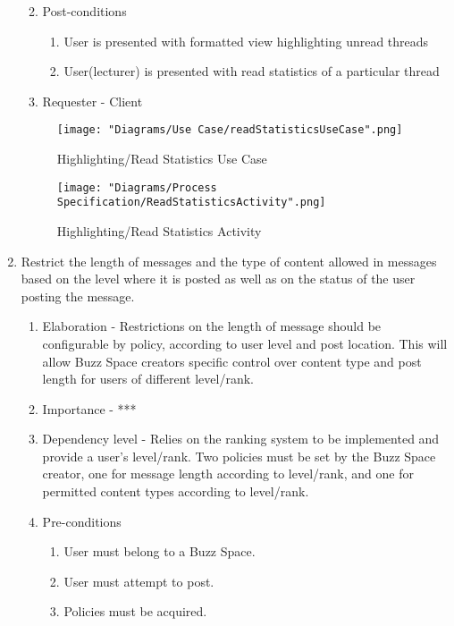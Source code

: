 \documentclass[12pt]{article}
\begin{document}
\begin{enumerate}
\begin{enumerate}
\begin{enumerate}
    \end{enumerate}
        \item Post-conditions
    \begin{enumerate}
    	\item User is presented with formatted view highlighting unread threads
    	\item User(lecturer) is presented with read statistics of a particular thread
    \end{enumerate}
    \item Requester - Client
  \end{enumerate}
  \begin{figure}[h]
  		\centering
  		\texttt{[image: "Diagrams/Use Case/readStatisticsUseCase".png]}
  		\caption{Highlighting/Read Statistics Use Case}
  	\end{figure}
  	\begin{figure}[h]
  		\centering
  		\texttt{[image: "Diagrams/Process Specification/ReadStatisticsActivity".png]}
  		\caption{Highlighting/Read Statistics Activity}
  	\end{figure}
\clearpage %
  \item Restrict the length of messages and the type of content allowed in messages based
on the level where it is posted as well as on the status of the user posting the
message.  %
  \begin{enumerate}
    \item Elaboration - Restrictions on the length of message should be configurable by policy, according to user level and post location. This will allow Buzz Space creators specific control over content type and post length for users of different level/rank.
    \item Importance - ***
    \item Dependency level - Relies on the ranking system to be implemented and provide a user's level/rank. Two policies must be set by the Buzz Space creator, one for message length according to level/rank, and one for permitted content types according to level/rank.
    \item Pre-conditions
    \begin{enumerate}
    	\item User must belong to a Buzz Space.
    	\item User must attempt to post.
	\item Policies must be acquired.

\end{enumerate}
\end{enumerate}
\end{enumerate}
\end{document}
